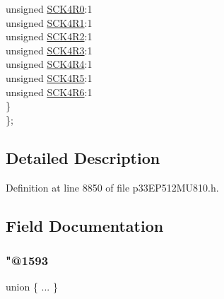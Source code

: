 \begin{DoxyCompactItemize}
\begin{tabbing}
\>\>unsigned \hyperlink{structtag_r_p_i_n_r31_b_i_t_s_a5869db1bcfa3b7300c26c181a08c8dea}{SCK4R0}:1\\
\>\>unsigned \hyperlink{structtag_r_p_i_n_r31_b_i_t_s_a94172221f0e0e3d5affb620d29123ed3}{SCK4R1}:1\\
\>\>unsigned \hyperlink{structtag_r_p_i_n_r31_b_i_t_s_a687debdabe096b0720398e04ea5a0f7b}{SCK4R2}:1\\
\>\>unsigned \hyperlink{structtag_r_p_i_n_r31_b_i_t_s_a2f927fcc0518ae0296465069e6d4af99}{SCK4R3}:1\\
\>\>unsigned \hyperlink{structtag_r_p_i_n_r31_b_i_t_s_aae2d8f35e58c24a15047cd32abb4e325}{SCK4R4}:1\\
\>\>unsigned \hyperlink{structtag_r_p_i_n_r31_b_i_t_s_aae08f6a617d16c81dfa7f5c88b4eb345}{SCK4R5}:1\\
\>\>unsigned \hyperlink{structtag_r_p_i_n_r31_b_i_t_s_a0aaf116b76e443524afe0e4dd48192bc}{SCK4R6}:1\\
\>\} \\
\}; \\

\end{tabbing}\end{DoxyCompactItemize}


\subsection{Detailed Description}


Definition at line 8850 of file p33\+E\+P512\+M\+U810.\+h.



\subsection{Field Documentation}
\mbox{\label{structtag_r_p_i_n_r31_b_i_t_s_ae9de53935ac54c9eca60b1f161958011}} 
\subsubsection{\texorpdfstring{"@1593}{@1593}}
{\footnotesize\ttfamily union \{ ... \} }

\mbox{\label{structtag_r_p_i_n_r31_b_i_t_s_adf71f3d8410c1f1dbbc96680a92c49af}} 
